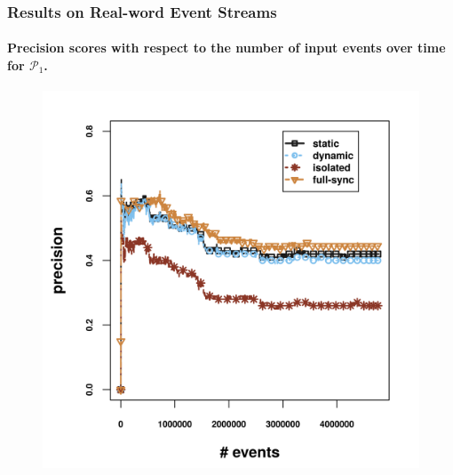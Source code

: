 \begin{frame}
	
	\frametitle{Results on Real-word Event Streams }
	\framesubtitle{Precision scores with respect to the number of input events over time for $\mathcal{P}_1$.}
	
	\begin{figure}[H]
		\centering
		\includegraphics[width=.9\textwidth,height=.8\textheight]{../chapters/figures/synopses/new/precision_p1.png}
		
	\end{figure}
	
\end{frame}



